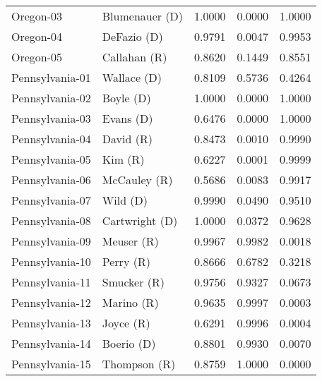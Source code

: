 \begin{longtable}{llrll}
         Oregon-03 &       {\color{Blue} Blumenauer (D)} &       1.0000 &        0.0000 &        1.0000 \\
         Oregon-04 &          {\color{Blue} DeFazio (D)} &       0.9791 &        0.0047 &        0.9953 \\
         Oregon-05 &          {\color{Red} Callahan (R)} &       0.8620 &        0.1449 &        0.8551 \\
   Pennsylvania-01 &          {\color{Blue} Wallace (D)} &       0.8109 &        0.5736 &        0.4264 \\
   Pennsylvania-02 &            {\color{Blue} Boyle (D)} &       1.0000 &        0.0000 &        1.0000 \\
   Pennsylvania-03 &            {\color{Blue} Evans (D)} &       0.6476 &        0.0000 &        1.0000 \\
   Pennsylvania-04 &             {\color{Red} David (R)} &       0.8473 &        0.0010 &        0.9990 \\
   Pennsylvania-05 &               {\color{Red} Kim (R)} &       0.6227 &        0.0001 &        0.9999 \\
   Pennsylvania-06 &          {\color{Red} McCauley (R)} &       0.5686 &        0.0083 &        0.9917 \\
   Pennsylvania-07 &             {\color{Blue} Wild (D)} &       0.9990 &        0.0490 &        0.9510 \\
   Pennsylvania-08 &       {\color{Blue} Cartwright (D)} &       1.0000 &        0.0372 &        0.9628 \\
   Pennsylvania-09 &            {\color{Red} Meuser (R)} &       0.9967 &        0.9982 &        0.0018 \\
   Pennsylvania-10 &             {\color{Red} Perry (R)} &       0.8666 &        0.6782 &        0.3218 \\
   Pennsylvania-11 &           {\color{Red} Smucker (R)} &       0.9756 &        0.9327 &        0.0673 \\
   Pennsylvania-12 &            {\color{Red} Marino (R)} &       0.9635 &        0.9997 &        0.0003 \\
   Pennsylvania-13 &             {\color{Red} Joyce (R)} &       0.6291 &        0.9996 &        0.0004 \\
   Pennsylvania-14 &           {\color{Blue} Boerio (D)} &       0.8801 &        0.9930 &        0.0070 \\
   Pennsylvania-15 &          {\color{Red} Thompson (R)} &       0.8759 &        1.0000 &        0.0000 \\

\end{longtable}
